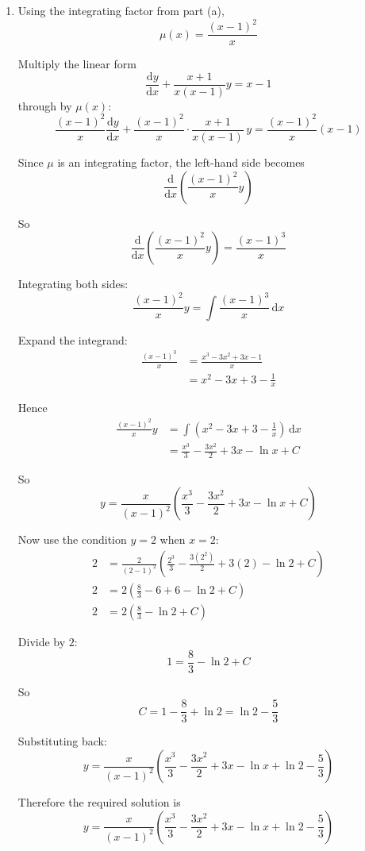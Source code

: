 \documentclass[leqno]{article}
\begin{document}
\begin{enumerate}[
  label=\textbf{\arabic*.},
  leftmargin=*,
  topsep=0pt,
  partopsep=0pt,
  parsep=0pt
]
\begin{tcolorbox}[colback=white, colframe=scarlet, title={\textbf{Solution}}, breakable, grow to left by=6mm, grow to right by=10mm]
\begin{enumerate}[label=\textbf{(\alph*)}]
  \item Using the integrating factor from part (a),
\[
\mu(x)=\frac{(x-1)^2}{x}
\]

Multiply the linear form
\[
\frac{\mathrm{d}y}{\mathrm{d}x}+\frac{x+1}{x(x-1)}y=x-1
\]
through by $\mu(x)$:
\[
\frac{(x-1)^2}{x}\frac{\mathrm{d}y}{\mathrm{d}x}+\frac{(x-1)^2}{x}\cdot\frac{x+1}{x(x-1)}\,y=\frac{(x-1)^2}{x}(x-1)
\]

Since $\mu$ is an integrating factor, the left-hand side becomes
\[
\frac{\mathrm{d}}{\mathrm{d}x}\left(\frac{(x-1)^2}{x}y\right)
\]

So
\[
\frac{\mathrm{d}}{\mathrm{d}x}\left(\frac{(x-1)^2}{x}y\right)=\frac{(x-1)^3}{x}
\]

Integrating both sides:
\[
\frac{(x-1)^2}{x}y=\int \frac{(x-1)^3}{x}\,\mathrm{d}x
\]

Expand the integrand:
\begin{align*}
\frac{(x-1)^3}{x}&=\frac{x^3-3x^2+3x-1}{x} \\
&=x^2-3x+3-\frac{1}{x}
\end{align*}

Hence
\begin{align*}
\frac{(x-1)^2}{x}y&=\int \left(x^2-3x+3-\frac{1}{x}\right)\,\mathrm{d}x \\
&=\frac{x^3}{3}-\frac{3x^2}{2}+3x-\ln x+C
\end{align*}

So
\[
y=\frac{x}{(x-1)^2}\left(\frac{x^3}{3}-\frac{3x^2}{2}+3x-\ln x+C\right)
\]

Now use the condition $y=2$ when $x=2$:
\begin{align*}
2&=\frac{2}{(2-1)^2}\left(\frac{2^3}{3}-\frac{3(2^2)}{2}+3(2)-\ln 2+C\right) \\
2&=2\left(\frac{8}{3}-6+6-\ln 2+C\right) \\
2&=2\left(\frac{8}{3}-\ln 2+C\right)
\end{align*}

Divide by $2$:
\[
1=\frac{8}{3}-\ln 2+C
\]

So
\[
C=1-\frac{8}{3}+\ln 2=\ln 2-\frac{5}{3}
\]

Substituting back:
\[
y=\frac{x}{(x-1)^2}\left(\frac{x^3}{3}-\frac{3x^2}{2}+3x-\ln x+\ln 2-\frac{5}{3}\right)
\]

Therefore the required solution is
\[
y=\frac{x}{(x-1)^2}\left(\frac{x^3}{3}-\frac{3x^2}{2}+3x-\ln x+\ln 2-\frac{5}{3}\right)
\]
\end{enumerate}
\end{tcolorbox}



\end{enumerate}
\end{document}
